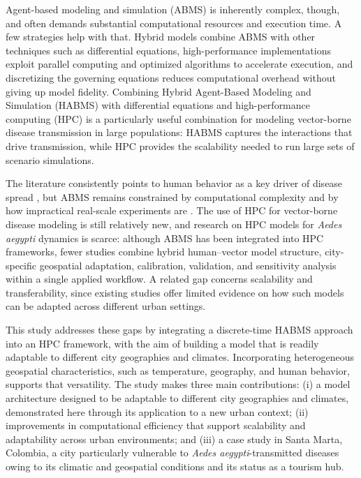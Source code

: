 \documentclass[applsci,article,accept,pdftex,moreauthors]{Definitions/mdpi}
\begin{document}
Agent-based modeling and simulation (ABMS) is inherently complex, though, and often demands substantial computational resources and execution time. A few strategies help with that. Hybrid models combine ABMS with other techniques such as differential equations, high-performance implementations exploit parallel computing and optimized algorithms to accelerate execution, and discretizing the governing equations reduces computational overhead without giving up model fidelity. Combining Hybrid Agent-Based Modeling and Simulation (HABMS) with differential equations and high-performance computing (HPC) is a particularly useful combination for modeling vector-borne disease transmission in large populations: HABMS captures the interactions that drive transmission, while HPC provides the scalability needed to run large sets of scenario simulations.

The literature consistently points to human behavior as a key driver of disease spread \cite{Topirceanu2024SpatialMobilityABM}, but ABMS remains constrained by computational complexity and by how impractical real-scale experiments are \cite{Zhang2025ABMEpidemicsReview}. The use of HPC for vector-borne disease modeling is still relatively new, and research on HPC models for \textit{Aedes aegypti} dynamics is scarce: although ABMS has been integrated into HPC frameworks, fewer studies combine hybrid human--vector model structure, city-specific geospatial adaptation, calibration, validation, and sensitivity analysis within a single applied workflow. A related gap concerns scalability and transferability, since existing studies offer limited evidence on how such models can be adapted across different urban settings.

This study addresses these gaps by integrating a discrete-time HABMS approach into an HPC framework, with the aim of building a model that is readily adaptable to different city geographies and climates. Incorporating heterogeneous geospatial characteristics, such as temperature, geography, and human behavior, supports that versatility. The study makes three main contributions: (i) a model architecture designed to be adaptable to different city geographies and climates, demonstrated here through its application to a new urban context; (ii) improvements in computational efficiency that support scalability and adaptability across urban environments; and (iii) a case study in Santa Marta, Colombia, a city particularly vulnerable to \textit{Aedes aegypti}-transmitted diseases owing to its climatic and geospatial conditions and its status as a tourism hub.
\end{document}
